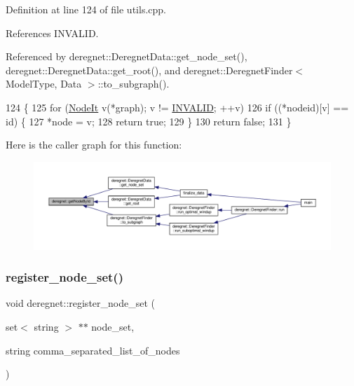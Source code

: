Definition at line 124 of file utils.\+cpp.



References I\+N\+V\+A\+L\+ID.



Referenced by deregnet\+::\+Deregnet\+Data\+::get\+\_\+node\+\_\+set(), deregnet\+::\+Deregnet\+Data\+::get\+\_\+root(), and deregnet\+::\+Deregnet\+Finder$<$ Model\+Type, Data $>$\+::to\+\_\+subgraph().


\begin{DoxyCode}
124                                                                                      \{
125     \textcolor{keywordflow}{for} (\hyperlink{namespacederegnet_ac34314e1b5f456fc6d1bb9d96316de4a}{NodeIt} v(*graph); v != \hyperlink{usinglemon_8hpp_adf770fe2eec438e3758ffe905dbae208}{INVALID}; ++v)
126         \textcolor{keywordflow}{if} ((*nodeid)[v] == \textcolor{keywordtype}{id}) \{
127             *node = v;
128             \textcolor{keywordflow}{return} \textcolor{keyword}{true};
129         \}
130     \textcolor{keywordflow}{return} \textcolor{keyword}{false};
131 \}
\end{DoxyCode}
Here is the caller graph for this function\+:\nopagebreak
\begin{figure}[H]
\begin{center}
\leavevmode
\includegraphics[width=350pt]{namespacederegnet_afefc9088a0ea47e8d8c1225b5de29244_icgraph}
\end{center}
\end{figure}
\mbox{\label{namespacederegnet_a639799db7e485ee8cc15b5933be7b4ba}} 
\subsubsection{\texorpdfstring{register\+\_\+node\+\_\+set()}{register\_node\_set()}\hspace{0.1cm}{\footnotesize\ttfamily [1/2]}}
{\footnotesize\ttfamily void deregnet\+::register\+\_\+node\+\_\+set (\begin{DoxyParamCaption}\item[{set$<$ string $>$ $\ast$$\ast$}]{node\+\_\+set,  }\item[{string}]{comma\+\_\+separated\+\_\+list\+\_\+of\+\_\+nodes }\end{DoxyParamCaption})}



